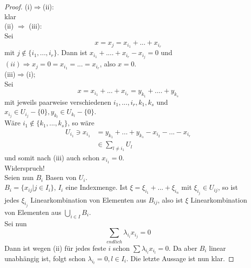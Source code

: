 \documentclass[12pt,a4paper]{article}
\theoremstyle{definition}
\theoremstyle{remark}
\begin{document}
	\begin{proof}
		(i)$ \Rightarrow $(ii): \\
		 klar \\
		(ii) $\Rightarrow$ (iii): \\
		Sei
		\begin{equation}
			x = x_j=x_{i_1}+...+x_{i_r}
		\end{equation}
		mit $j \notin \{ i_1,...,i_r \}$. Dann ist $x_{i_1}+....+x_{i_r}-x_{i_j}=0$ und $(ii) \Rightarrow x_j =0=x_{i_1}=...=x_{i_r}$, also $x=0$. \\
		(iii)$\Rightarrow$(i); \\
		Sei 
		\begin{equation}
			x = x_{i_1}+...+x_{i_r}= y_{k_1}+....+y_{k_s}
		\end{equation}
		mit jeweils paarweise verschiedenen $i_1,...,i_r,k_1,k_s$ und $x_{i_j} \in U_{i_j}-\{ 0\}, y_{k_l} \in U_{k_l}-\{0 \}$. \\
		Wäre $i_1 \notin \{ k_1,...,k_s \}$, so wäre
		\begin{equation}
			\begin{split}
				U_{i_1} \ni x_{i_1} &= y_{k_1}+...+y_{k_s}-x_{i_2}-...-x_{i_r} \\
				& \in \sum_{l \neq i_1} U_l
			\end{split}
		\end{equation}
		und somit nach (iii) auch schon $x_{i_1} =0$. \\
		Widerspruch!\\
		Seien nun $B_i$ Basen von $U_i$. \\
		$B_i = \{ x_{ij} | j \in I_i \}$, $I_i$ eine Indexmenge. Ist $\xi = \xi_{i_1}+...+\xi_{i_n}$ mit $\xi_{i_j} \in U_{ij}$, so ist jedes $\xi_{i_j}$ Linearkombination von Elementen aus $B_{ij}$, also ist $\xi$ Linearkombination von Elementen aus $\bigcup_{i \in I} B_i$. \\
		Sei nun
		\begin{equation}
			\sum\limits_{endlich} \lambda_{i_l}x_{i_j}=0
		\end{equation}
		Dann ist wegen (ii) für jedes feste $i$ schon $\sum \lambda_{i_l}x_{i_l}=0$. Da aber $B_i$ linear unabhängig ist, folgt schon $\lambda_{i_l}=0, l \in I_i$.
		Die letzte Aussage ist nun klar.
	\end{proof}
\end{document}
